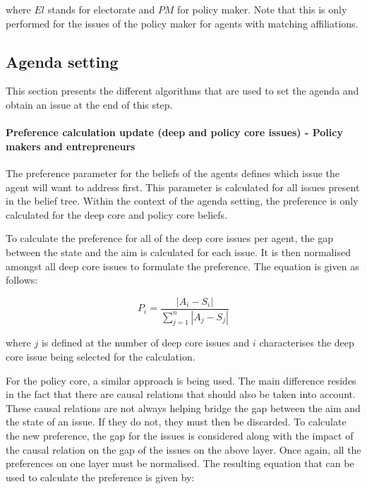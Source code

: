 where $El$ stands for electorate and $PM$ for policy maker. Note that this is only performed for the issues of the policy maker for agents with matching affiliations.


\subsection{Agenda setting}

This section presents the different algorithms that are used to set the agenda and obtain an issue at the end of this step.

\paragraph{Preference calculation update (deep and policy core issues) - Policy makers and entrepreneurs}

The preference parameter for the beliefs of the agents defines which issue the agent will want to address first. This parameter is calculated for all issues present in the belief tree. Within the context of the agenda setting, the preference is only calculated for the deep core and policy core beliefs.



To calculate the preference for all of the deep core issues per agent, the gap between the state and the aim is calculated for each issue. It is then normalised amongst all deep core issues to formulate the preference. The equation is given as follows:

\begin{equation}
P_i = \frac{ |A_i - S_i|}{\sum_{j=1}^n |A_j - S_j|}
\end{equation}

where $j$ is defined at the number of deep core issues and $i$ characterises the deep core issue being selected for the calculation.

For the policy core, a similar approach is being used. The main difference resides in the fact that there are causal relations that should also be taken into account. These causal relations are not always helping bridge the gap between the aim and the state of an issue. If they do not, they must then be discarded. To calculate the new preference, the gap for the issues is considered along with the impact of the causal relation on the gap of the issues on the above layer. Once again, all the preferences on one layer must be normalised. The resulting equation that can be used to calculate the preference is given by:


